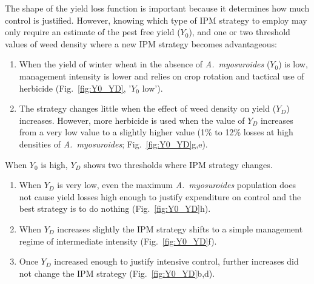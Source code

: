 \documentclass[9pt,twocolumn,twoside,lineno]{pnas-new}
\begin{document}
The shape of the yield loss function is important because it determines how much control is justified. However, knowing which type of IPM strategy to employ may only require an estimate of the pest free yield ($Y_0$), and one or two threshold values of weed density where a new IPM strategy becomes advantageous:
\begin{enumerate}
	\item When the yield of winter wheat in the absence of \textit{A.\ myosuroides} ($Y_0$) is low, management intensity is lower and relies on crop rotation and tactical use of herbicide (Fig.\ \ref{fig:Y0_YD}, '$Y_0$ low').
	\item The strategy changes little when the effect of weed density on yield ($Y_D$) increases. However, more herbicide is used when the value of $Y_D$ increases from a very low value to a slightly higher value (1\% to 12\% losses at high densities of \textit{A.\ myosuroides}; Fig.\ \ref{fig:Y0_YD}g,e). 
\end{enumerate}
When $Y_0$ is high, $Y_D$ shows two thresholds where IPM strategy changes. 
\begin{enumerate}
	\item When $Y_D$ is very low, even the maximum \textit{A.\ myosuroides} population does not cause yield losses high enough to justify expenditure on control and the best strategy is to do nothing (Fig.\ \ref{fig:Y0_YD}h).
	\item When $Y_D$ increases slightly the IPM strategy shifts to a simple management regime of intermediate intensity (Fig.\ \ref{fig:Y0_YD}f). 
	\item Once $Y_D$ increased enough to justify intensive control, further increases did not change the IPM strategy (Fig.\ \ref{fig:Y0_YD}b,d).    
\end{enumerate}
 
\end{document}
